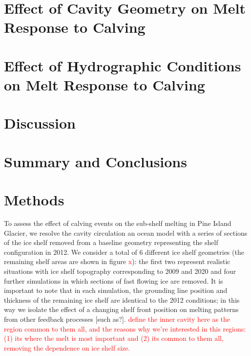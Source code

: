 \documentclass[draft]{agujournal2019}
\newcommand{\red}[1]{\textcolor{red}{#1}}
\begin{document}

\section{Effect of Cavity Geometry on Melt Response to Calving}

\section{Effect of Hydrographic Conditions on Melt Response to Calving}

\section{Discussion}

\section{Summary and Conclusions}




\section{Methods}
To assess the effect of calving events on the sub-shelf melting in Pine Island Glacier, we resolve the cavity circulation an ocean model with a series of sections of the ice shelf removed from a baseline geometry representing the shelf configuration in 2012. We consider a total of 6 different ice shelf geometries (the remaining shelf areas are shown in figure \red{x}): the first two represent realistic situations with ice shelf topography corresponding to 2009 and 2020 and four further simulations in which sections of fast flowing ice are removed. It is important to note that in each simulation, the grounding line position and thickness of the remaining ice shelf are identical to the 2012 conditions; in this way we isolate the effect of a changing shelf front position on melting patterns from other feedback processes [such as?]. \red{define the inner cavity here as the region common to them all, and the reasons why we're interested in this regions: (1) its where the melt is most important and (2) its common to them all, removing the dependence on ice shelf size.}
\end{document}

